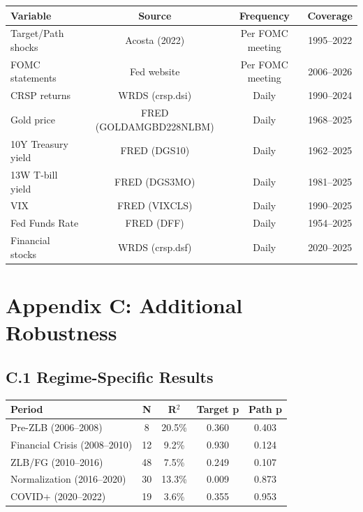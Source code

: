 \documentclass[12pt]{article}
\begin{document}
\begin{table}[htbp]\centering
\begin{tabular}{lccc}\toprule
Variable & Source & Frequency & Coverage \\\midrule
Target/Path shocks & Acosta (2022) & Per FOMC meeting & 1995--2022 \\
FOMC statements & Fed website & Per FOMC meeting & 2006--2026 \\
CRSP returns & WRDS (crsp.dsi) & Daily & 1990--2024 \\
Gold price & FRED (GOLDAMGBD228NLBM) & Daily & 1968--2025 \\
10Y Treasury yield & FRED (DGS10) & Daily & 1962--2025 \\
13W T-bill yield & FRED (DGS3MO) & Daily & 1981--2025 \\
VIX & FRED (VIXCLS) & Daily & 1990--2025 \\
Fed Funds Rate & FRED (DFF) & Daily & 1954--2025 \\
Financial stocks & WRDS (crsp.dsf) & Daily & 2020--2025 \\
\bottomrule\end{tabular}
\end{table}


\section{Appendix C: Additional Robustness}

\subsection{C.1 Regime-Specific Results}

\begin{table}[htbp]\centering
\begin{tabular}{lcccc}\toprule
Period & N & R$^2$ & Target p & Path p \\\midrule
Pre-ZLB (2006--2008) & 8 & 20.5\% & 0.360 & 0.403 \\
Financial Crisis (2008--2010) & 12 & 9.2\% & 0.930 & 0.124 \\
ZLB/FG (2010--2016) & 48 & 7.5\% & 0.249 & 0.107 \\
Normalization (2016--2020) & 30 & 13.3\% & 0.009 & 0.873 \\
COVID+ (2020--2022) & 19 & 3.6\% & 0.355 & 0.953 \\
\bottomrule\end{tabular}
\end{table}
\end{document}
